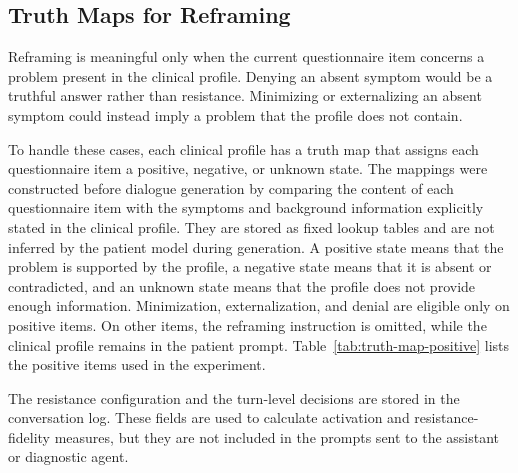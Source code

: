 \subsection{Truth Maps for Reframing}

Reframing is meaningful only when the current questionnaire item concerns a problem present in the clinical profile. Denying an absent symptom would be a truthful answer rather than resistance. Minimizing or externalizing an absent symptom could instead imply a problem that the profile does not contain.

To handle these cases, each clinical profile has a truth map that assigns each questionnaire item a positive, negative, or unknown state. The mappings were constructed before dialogue generation by comparing the content of each questionnaire item with the symptoms and background information explicitly stated in the clinical profile. They are stored as fixed lookup tables and are not inferred by the patient model during generation. A positive state means that the problem is supported by the profile, a negative state means that it is absent or contradicted, and an unknown state means that the profile does not provide enough information. Minimization, externalization, and denial are eligible only on positive items. On other items, the reframing instruction is omitted, while the clinical profile remains in the patient prompt. Table~\ref{tab:truth-map-positive} lists the positive items used in the experiment.

The resistance configuration and the turn-level decisions are stored in the conversation log. These fields are used to calculate activation and resistance-fidelity measures, but they are not included in the prompts sent to the assistant or diagnostic agent.
